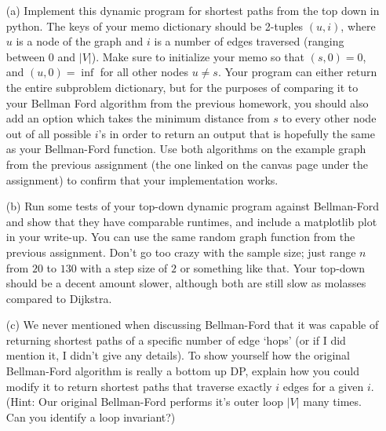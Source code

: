 \documentclass[12pt]{article}
\begin{document}
\begin{enumerate}
     \begin{itemize}
        \item[(a)] Implement this dynamic program for shortest paths from the top down in python. The keys of your memo dictionary should be 2-tuples $(u,i)$, where $u$ is a node of the graph and $i$ is a number of edges traversed (ranging between $0$ and $|V|$). Make sure to initialize your memo so that $(s,0) = 0$, and $(u,0) = \inf$ for all other nodes $u \neq s$. Your program can either return the entire subproblem dictionary, but for the purposes of comparing it to your Bellman Ford algorithm from the previous homework, you should also add an option which takes the minimum distance from $s$ to every other node out of all possible $i$'s in order to return an output that is hopefully the same as your Bellman-Ford function. Use both algorithms on the example graph from the previous assignment (the one linked on the canvas page under the assignment) to confirm that your implementation works.
        \item[(b)] Run some tests of your top-down dynamic program against Bellman-Ford and show that they have comparable runtimes, and include a matplotlib plot in your write-up. You can use the same random graph function from the previous assignment. Don't go too crazy with the sample size; just range $n$ from $20$ to $130$ with a step size of $2$ or something like that. Your top-down should be a decent amount slower, although both are still slow as molasses compared to Dijkstra. \
        \item[(c)] We never mentioned when discussing Bellman-Ford that it was capable of returning shortest paths of a specific number of edge `hops' (or if I did mention it, I didn't give any details). To show yourself how the original Bellman-Ford algorithm is really a bottom up DP, explain how you could modify it to return shortest paths that traverse exactly $i$ edges for a given $i$. (Hint: Our original Bellman-Ford performs it's outer loop $|V|$ many times. Can you identify a loop invariant?) 
     \end{itemize}
\end{enumerate}
\end{document}
